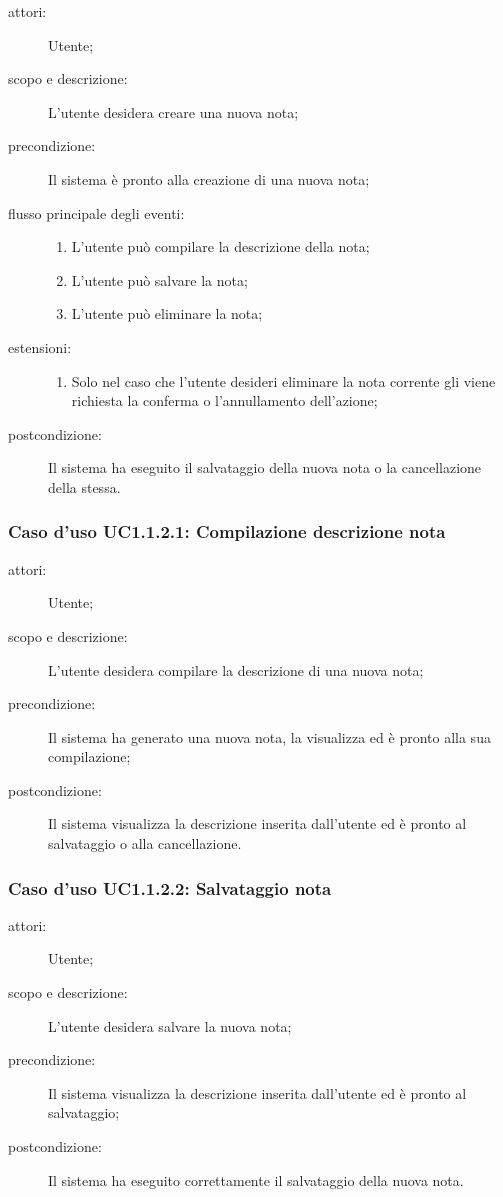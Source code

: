 \begin{description}
\item[attori:] Utente;
\item[scopo e descrizione:] L'utente desidera creare una nuova nota;
\item[precondizione:] Il sistema è pronto alla creazione di una nuova nota;
\item[flusso principale degli eventi:] \hfill 
	\begin{enumerate}
	\item L'utente può compilare la descrizione della nota;
	\item L'utente può salvare la nota;
	\item L'utente può eliminare la nota;
	\end{enumerate}
\item[estensioni:] \hfill
	\begin{enumerate}
	\item Solo nel caso che l'utente desideri eliminare la nota corrente gli viene richiesta la conferma o l'annullamento dell'azione;
	\end{enumerate}
\item[postcondizione:] Il sistema ha eseguito il salvataggio della nuova nota o la cancellazione della stessa.
\end{description}

\subsubsection{Caso d'uso UC1.1.2.1: Compilazione descrizione nota}
\begin{description}
\item[attori:] Utente;
\item[scopo e descrizione:] L'utente desidera compilare la descrizione di una nuova nota;
\item[precondizione:] Il sistema ha generato una nuova nota, la visualizza ed è pronto alla sua compilazione;
\item[postcondizione:] Il sistema visualizza la descrizione inserita dall'utente ed è pronto al salvataggio o alla cancellazione.
\end{description}

\subsubsection{Caso d'uso UC1.1.2.2: Salvataggio nota}
\begin{description}
\item[attori:] Utente;
\item[scopo e descrizione:] L'utente desidera salvare la nuova nota;
\item[precondizione:] Il sistema visualizza la descrizione inserita dall'utente ed è pronto al salvataggio;
\item[postcondizione:] Il sistema ha eseguito correttamente il salvataggio della nuova nota.
\end{description}

